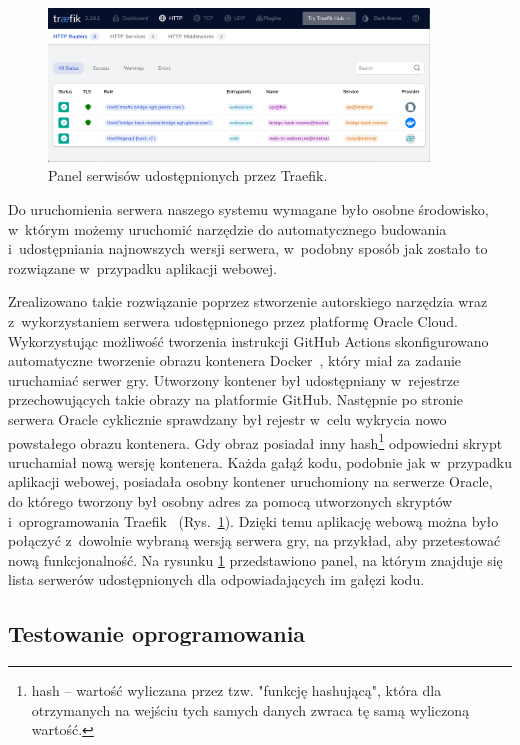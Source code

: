 \begin{figure}[!]
    \centering
    \includegraphics[width=0.9\textwidth]{img/traefik/dashboard.png}
    \caption{Panel serwisów udostępnionych przez Traefik.}
    \label{fig:traefik-dashboard}
\end{figure}

Do uruchomienia serwera naszego systemu wymagane było
osobne środowisko, w~którym możemy uruchomić
narzędzie do automatycznego budowania i~udostępniania
najnowszych wersji serwera, w~podobny sposób jak zostało
to rozwiązane w~przypadku aplikacji webowej.

Zrealizowano takie rozwiązanie poprzez stworzenie autorskiego
narzędzia wraz z~wykorzystaniem serwera udostępnionego
przez platformę Oracle Cloud.
Wykorzystując możliwość tworzenia instrukcji GitHub Actions
skonfigurowano automatyczne tworzenie obrazu kontenera
Docker~\cite{Docker}, który miał za zadanie uruchamiać
serwer gry. Utworzony kontener był udostępniany w~rejestrze
przechowujących takie obrazy na
platformie GitHub. Następnie po stronie serwera Oracle
cyklicznie sprawdzany był rejestr w~celu wykrycia
nowo powstałego obrazu kontenera. Gdy obraz posiadał
inny hash\footnote{hash -- wartość wyliczana przez tzw. "funkcję
    hashującą", która dla otrzymanych na wejściu tych
    samych danych zwraca tę samą wyliczoną wartość.}
odpowiedni skrypt uruchamiał nową wersję kontenera.
Każda gałąź kodu, podobnie jak w~przypadku aplikacji
webowej, posiadała osobny kontener uruchomiony na serwerze
Oracle, do którego tworzony był osobny adres za pomocą
utworzonych skryptów i~oprogramowania Traefik~\cite{Traefik} (Rys.~\ref{fig:traefik-dashboard}).
Dzięki temu aplikację webową można było połączyć
z~dowolnie wybraną wersją serwera gry, na przykład, aby
przetestować nową funkcjonalność. Na rysunku
\ref{fig:traefik-dashboard} przedstawiono panel, na którym
znajduje się lista serwerów udostępnionych dla
odpowiadających im gałęzi kodu.

\FloatBarrier


\subsection{Testowanie oprogramowania}

